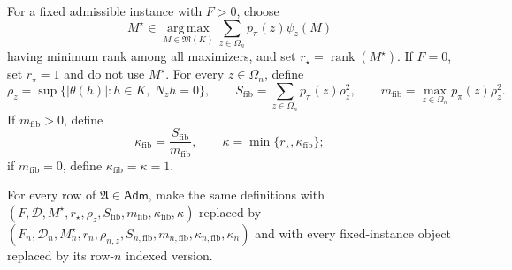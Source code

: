 For a fixed admissible instance with \(F>0\), choose
\[
 M^{\star}\in\operatorname*{arg\,max}_{M\in\mathfrak M(K)}
 \sum_{z\in\Omega_n}p_{\pi}(z)\psi_z(M)
\]
having minimum rank among all maximizers, and set \(r_{\star}=\operatorname{rank}(M^{\star})\). If \(F=0\), set \(r_{\star}=1\) and do not use \(M^{\star}\). For every \(z\in\Omega_n\), define
\[
 \rho_z=\sup\{\lvert\theta(h)\rvert:h\in K,\ N_zh=0\},\qquad
 S_{\mathrm{fib}}=\sum_{z\in\Omega_n}p_{\pi}(z)\rho_z^2,
 \qquad
 m_{\mathrm{fib}}=\max_{z\in\Omega_n}p_{\pi}(z)\rho_z^2.
\]
If \(m_{\mathrm{fib}}>0\), define
\[
 \kappa_{\mathrm{fib}}=\frac{S_{\mathrm{fib}}}{m_{\mathrm{fib}}},
 \qquad
 \kappa=\min\{r_{\star},\kappa_{\mathrm{fib}}\};
\]
if \(m_{\mathrm{fib}}=0\), define \(\kappa_{\mathrm{fib}}=\kappa=1\).

For every row of \(\mathfrak A\in\mathsf{Adm}\), make the same definitions with \((F,\mathcal D,M^{\star},r_{\star},\rho_z,S_{\mathrm{fib}},m_{\mathrm{fib}},\kappa_{\mathrm{fib}},\kappa)\) replaced by \((F_n,\mathcal D_n,M_n^{\star},r_n,\rho_{n,z},S_{n,\mathrm{fib}},m_{n,\mathrm{fib}},\kappa_{n,\mathrm{fib}},\kappa_n)\) and with every fixed-instance object replaced by its row-\(n\) indexed version.